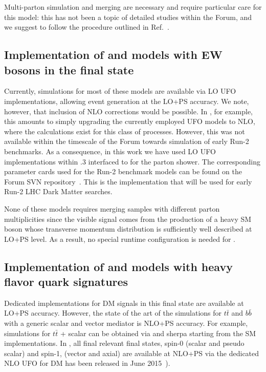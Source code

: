 Multi-parton simulation and merging are necessary and require particular care for this model: this has not been a topic of detailed studies within the Forum, and we suggest to follow the procedure outlined in Ref.~\cite{Papucci:2014iwa}. 

\subsection{Implementation of \schannel and  \tchannel models with EW bosons in the final state}
\label{sec:EW_implementation}

Currently, simulations for most of these models are available via LO UFO implementations, allowing event generation at the LO+PS accuracy. We note, however, that inclusion of NLO corrections would be possible. In \madgraph, for example, this amounts to simply upgrading the currently employed UFO models to NLO, where the calculations exist for this class of processes. However, this was not available within the timescale of the Forum towards simulation of early Run-2 benchmarks. As a consequence, in this work we have used LO UFO implementations within .3 interfaced to \pythiaEight for the parton shower. The corresponding parameter cards used for the Run-2 benchmark models can be found on the Forum SVN repository~\cite{ForumSVN_EW_DMV}. This is the implementation that will be used for early Run-2 LHC Dark Matter searches.

None of these models requires merging samples with different parton multiplicities  
since the visible signal comes from the production of a heavy SM boson whose transverse momentum distribution is sufficiently 
well described at LO+PS level.  As a result, no special runtime configuration is needed for \pythiaEight. 

\subsection{\texorpdfstring{Implementation of \schannel and \tchannel models with heavy flavor quark signatures}{Simulations for models with heavy flavor quark signatures}}
\label{sec:TTBar_implementation}

Dedicated implementations for DM signals in this final state are available at LO+PS accuracy. 
However, the state of the art of the simulations for $t \bar{t}$ and $b \bar{b}$ with a generic scalar and vector mediator is NLO+PS accuracy. For example, simulations for $t \bar{t}$ + scalar can be obtained via \powheg and {\sc sherpa} starting from the SM implementations. In \madgraph,  all final relevant final states, spin-0 (scalar and pseudo scalar) and spin-1, (vector and axial) are available  at NLO+PS via the dedicated NLO UFO for DM has been released in June 2015~\cite{NewMadgraphModels}).

